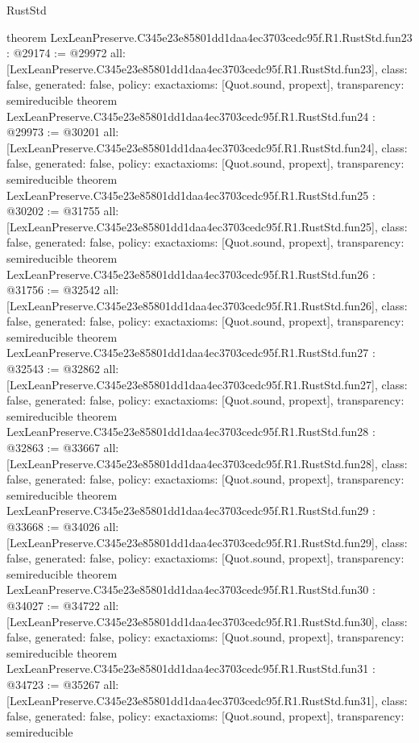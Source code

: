 \begin{lexlean}{RustStd}
\begin{coremodule}
{}
theorem LexLeanPreserve.C345e23e85801dd1daa4ec3703cedc95f.R1.RustStd.fun23 : @29174 := @29972 {
  all: [LexLeanPreserve.C345e23e85801dd1daa4ec3703cedc95f.R1.RustStd.fun23],
  class: false,
  generated: false,
  policy: exact{axioms: [Quot.sound, propext]},
  transparency: semireducible
}
theorem LexLeanPreserve.C345e23e85801dd1daa4ec3703cedc95f.R1.RustStd.fun24 : @29973 := @30201 {
  all: [LexLeanPreserve.C345e23e85801dd1daa4ec3703cedc95f.R1.RustStd.fun24],
  class: false,
  generated: false,
  policy: exact{axioms: [Quot.sound, propext]},
  transparency: semireducible
}
theorem LexLeanPreserve.C345e23e85801dd1daa4ec3703cedc95f.R1.RustStd.fun25 : @30202 := @31755 {
  all: [LexLeanPreserve.C345e23e85801dd1daa4ec3703cedc95f.R1.RustStd.fun25],
  class: false,
  generated: false,
  policy: exact{axioms: [Quot.sound, propext]},
  transparency: semireducible
}
theorem LexLeanPreserve.C345e23e85801dd1daa4ec3703cedc95f.R1.RustStd.fun26 : @31756 := @32542 {
  all: [LexLeanPreserve.C345e23e85801dd1daa4ec3703cedc95f.R1.RustStd.fun26],
  class: false,
  generated: false,
  policy: exact{axioms: [Quot.sound, propext]},
  transparency: semireducible
}
theorem LexLeanPreserve.C345e23e85801dd1daa4ec3703cedc95f.R1.RustStd.fun27 : @32543 := @32862 {
  all: [LexLeanPreserve.C345e23e85801dd1daa4ec3703cedc95f.R1.RustStd.fun27],
  class: false,
  generated: false,
  policy: exact{axioms: [Quot.sound, propext]},
  transparency: semireducible
}
theorem LexLeanPreserve.C345e23e85801dd1daa4ec3703cedc95f.R1.RustStd.fun28 : @32863 := @33667 {
  all: [LexLeanPreserve.C345e23e85801dd1daa4ec3703cedc95f.R1.RustStd.fun28],
  class: false,
  generated: false,
  policy: exact{axioms: [Quot.sound, propext]},
  transparency: semireducible
}
theorem LexLeanPreserve.C345e23e85801dd1daa4ec3703cedc95f.R1.RustStd.fun29 : @33668 := @34026 {
  all: [LexLeanPreserve.C345e23e85801dd1daa4ec3703cedc95f.R1.RustStd.fun29],
  class: false,
  generated: false,
  policy: exact{axioms: [Quot.sound, propext]},
  transparency: semireducible
}
theorem LexLeanPreserve.C345e23e85801dd1daa4ec3703cedc95f.R1.RustStd.fun30 : @34027 := @34722 {
  all: [LexLeanPreserve.C345e23e85801dd1daa4ec3703cedc95f.R1.RustStd.fun30],
  class: false,
  generated: false,
  policy: exact{axioms: [Quot.sound, propext]},
  transparency: semireducible
}
theorem LexLeanPreserve.C345e23e85801dd1daa4ec3703cedc95f.R1.RustStd.fun31 : @34723 := @35267 {
  all: [LexLeanPreserve.C345e23e85801dd1daa4ec3703cedc95f.R1.RustStd.fun31],
  class: false,
  generated: false,
  policy: exact{axioms: [Quot.sound, propext]},
  transparency: semireducible
}
\end{coremodule}
\end{lexlean}
